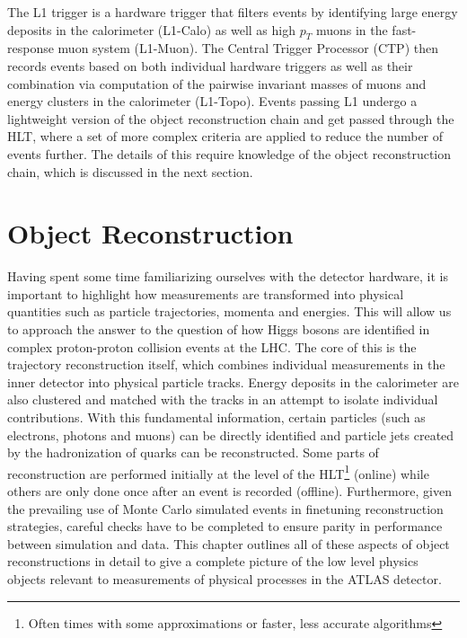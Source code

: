 The L1 trigger is a hardware trigger that filters events by identifying large energy deposits in the calorimeter 
(L1-Calo) as well as high $p_T$ muons in the fast-response muon system (L1-Muon). The Central Trigger Processor (CTP) 
then records events based on both individual hardware triggers as well as their combination via computation of the 
pairwise invariant masses of muons and energy clusters in the calorimeter (L1-Topo). Events passing L1 undergo a 
lightweight version of the object reconstruction chain and get passed through the HLT, where a set of more complex 
criteria are applied to reduce the number of events further. The details of this require knowledge of the object 
reconstruction chain, which is discussed in the next section.

\section{Object Reconstruction}

Having spent some time familiarizing ourselves with the detector hardware, it is important to highlight how 
measurements are transformed into physical quantities such as particle trajectories, momenta and energies. This 
will allow us to approach the answer to the question of how Higgs bosons are identified in complex proton-proton 
collision events at the LHC. The core of this is the trajectory reconstruction itself, which combines individual 
measurements in the inner detector into physical particle tracks. Energy deposits in the calorimeter are also 
clustered and matched with the tracks in an attempt to isolate individual contributions. With this fundamental 
information, certain particles (such as electrons, photons and muons) can be directly identified and particle jets 
created by the hadronization of quarks can be reconstructed. Some parts of reconstruction are performed initially 
at the level of the HLT\footnote{Often times with some approximations or faster, less accurate algorithms} (online) 
while others are only done once after an event is recorded (offline). Furthermore, given the prevailing use of Monte 
Carlo simulated events in finetuning reconstruction strategies, careful checks have to be completed to ensure 
parity in performance between simulation and data. This chapter outlines all of these aspects of object 
reconstructions in detail to give a complete picture of the low level physics objects relevant to measurements of 
physical processes in the ATLAS detector. \par

